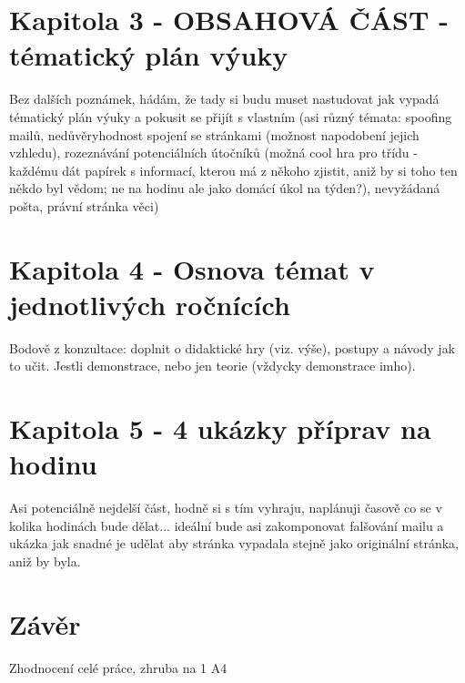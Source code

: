 \documentclass[a4paper, 11pt]{article}
\begin{document}
\section{Kapitola 3 - OBSAHOVÁ ČÁST - tématický plán výuky}
Bez dalších poznámek, hádám, že tady si budu muset nastudovat jak vypadá tématický plán výuky a pokusit se přijít s vlastním (asi různý témata: spoofing mailů, nedůvěryhodnost spojení se stránkami (možnost napodobení jejich vzhledu), rozeznávání potenciálních útočníků (možná cool hra pro třídu - každému dát papírek s informací, kterou má z někoho zjistit, aniž by si toho ten někdo byl vědom; ne na hodinu ale jako domácí úkol na týden?), nevyžádaná pošta, právní stránka věci)


\section{Kapitola 4 - Osnova témat v jednotlivých ročnících}
Bodově z konzultace: doplnit o didaktické hry (viz. výše), postupy a návody jak to učit. Jestli demonstrace, nebo jen teorie (vždycky demonstrace imho).

\section{Kapitola 5 - 4 ukázky příprav na hodinu}
Asi potenciálně nejdelší část, hodně si s tím vyhraju, naplánuji časově co se v kolika hodinách bude dělat... ideální bude asi zakomponovat falšování mailu a ukázka jak snadné je udělat aby stránka vypadala stejně jako originální stránka, aniž by byla.

\section{Závěr}
Zhodnocení celé práce, zhruba na 1 A4
\end{document}
